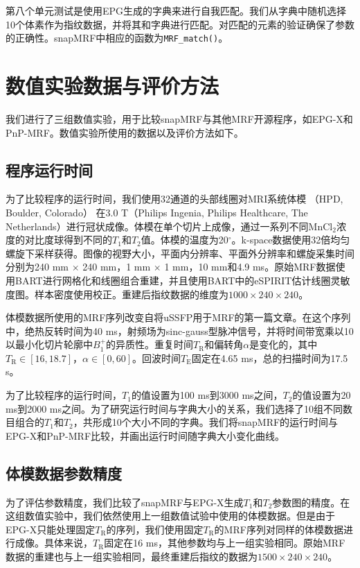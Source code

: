 第八个单元测试是使用EPG生成的字典来进行自我匹配。我们从字典中随机选择10个体素作为指纹数据，并将其和字典进行匹配。对匹配的元素的验证确保了参数的正确性。snapMRF中相应的函数为\texttt{MRF\_match()}。

\section{数值实验数据与评价方法}
我们进行了三组数值实验，用于比较snapMRF与其他MRF开源程序，如EPG-X和PnP-MRF。数值实验所使用的数据以及评价方法如下。

\subsection{程序运行时间}
为了比较程序的运行时间，我们使用32通道的头部线圈对MRI系统体模 \cite{keenan_comparison_2016}（HPD, Boulder, Colorado） 在3.0 T（Philips Ingenia, Philips Healthcare, The Netherlands）进行冠状成像。体模在单个切片上成像，通过一系列不同MnCl$_2$浓度的对比度球得到不同的$T_1$和$T_2$值。体模的温度为20$^{\circ}$。k-space数据使用32倍均匀螺旋下采样获得\cite{pipe_spiral_2014}。图像的视野大小，平面内分辨率、平面外分辨率和螺旋采集时间分别为240 mm $\times$ 240 mm，1 mm $\times$ 1 mm，10 mm和4.9 ms。原始MRF数据使用BART\cite{bart}进行网格化和线圈组合重建，并且使用BART中的eSPIRIT估计线圈灵敏度图。样本密度使用\cite{zwart_sdc_2012}校正。重建后指纹数据的维度为$1000 \times 240 \times 240$。

体模数据所使用的MRF序列改变自将uSSFP用于MRF的第一篇文章\cite{jiang}。在这个序列中，绝热反转时间为40 ms，射频场为sinc-gauss型脉冲信号，并将时间带宽乘以10以最小化切片轮廓中$B_1^+$的异质性。重复时间$T_\mathrm{R}$和偏转角$\alpha$是变化的，其中$T_\mathrm{R}\in [16,18.7]$，$\alpha \in [0,60]$。回波时间$T_\mathrm{E}$固定在4.65 ms，总的扫描时间为17.5 s。

为了比较程序的运行时间，$T_1$的值设置为100 ms到3000 ms之间，$T_2$的值设置为20 ms到2000 ms之间。为了研究运行时间与字典大小的关系，我们选择了10组不同数目组合的$T_1$和$T_2$，共形成10个大小不同的字典。我们将snapMRF的运行时间与EPG-X\cite{malik_extended_2018}和PnP-MRF\cite{cloos2016multiparametric}比较，并画出运行时间随字典大小变化曲线。

\subsection{体模数据参数精度}
为了评估参数精度，我们比较了snapMRF与EPG-X生成$T_1$和$T_2$参数图的精度。在这组数值实验中，我们依然使用上一组数值试验中使用的体模数据。但是由于EPG-X只能处理固定$T_\mathrm{R}$的序列，我们使用固定$T_\mathrm{R}$的MRF序列对同样的体模数据进行成像。具体来说，$T_\mathrm{R}$固定在16 ms，其他参数均与上一组实验相同。原始MRF数据的重建也与上一组实验相同，最终重建后指纹的数据为$1500 \times 240 \times 240$。


